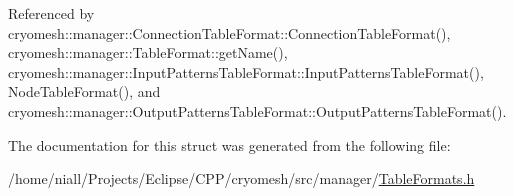 \-Referenced by cryomesh\-::manager\-::\-Connection\-Table\-Format\-::\-Connection\-Table\-Format(), cryomesh\-::manager\-::\-Table\-Format\-::get\-Name(), cryomesh\-::manager\-::\-Input\-Patterns\-Table\-Format\-::\-Input\-Patterns\-Table\-Format(), \-Node\-Table\-Format(), and cryomesh\-::manager\-::\-Output\-Patterns\-Table\-Format\-::\-Output\-Patterns\-Table\-Format().



\-The documentation for this struct was generated from the following file\-:\begin{DoxyCompactItemize}
\item 
/home/niall/\-Projects/\-Eclipse/\-C\-P\-P/cryomesh/src/manager/\hyperlink{TableFormats_8h}{\-Table\-Formats.\-h}\end{DoxyCompactItemize}

